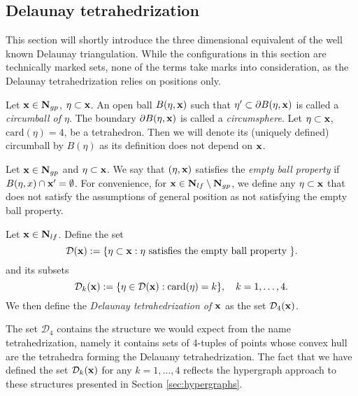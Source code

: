 \subsection{Delaunay tetrahedrization}
This section will shortly introduce the three dimensional equivalent of the well known Delaunay triangulation. While the configurations in this section are technically marked sets, none of the terms take marks into consideration, as the Delaunay tetrahedrization relies on positions only.

\begin{definition}
	Let ${\mathbf{x}} \in \mathbf N_{gp}$, $\eta \subset {\mathbf{x}}$. An open ball $B(\eta,{\mathbf{x}})$ such that $\eta' \subset \partial B(\eta,{\mathbf{x}})$ is called a \textit{circumball of $\eta$}. The boundary $\partial B(\eta,{\mathbf{x}})$ is called a \textit{circumsphere}.
	Let $\eta\subset{\mathbf{x}}$, $\mathrm{card}(\eta)=4$, be a tetrahedron. Then we will denote its (uniquely defined) circumball by $B(\eta)$ as its definition does not depend on ${\mathbf{x}}$. 
\end{definition}	

\begin{definition}
	Let ${\mathbf{x}} \in \mathbf N_{gp}$ and $\eta \subset {\mathbf{x}}$. We say that $(\eta,{\mathbf{x}})$ satisfies the \textit{empty ball property} if $B(\eta,x) \cap {\mathbf{x}}' = \emptyset$. 
	For convenience, for ${\mathbf{x}} \in \mathbf N_{lf}\setminus \mathbf N_{gp}$, we define any $\eta\subset {\mathbf{x}}$ that does not satisfy the assumptions of general position as not satisfying the empty ball property.
\end{definition}

\begin{definition}
	Let ${\mathbf{x}} \in \mathbf N_{lf}$. Define the set 
	$$\mathcal {D}({\mathbf{x}}) := \{\eta\subset {\mathbf{x}}: \eta \text{ satisfies the empty ball property }\}.$$
	and its subsets
	$$\mathcal {D}_k({\mathbf{x}}) := \{\eta \in \mathcal {D}({\mathbf{x}}): \mathrm{card}(\eta)=k \},\quad k = 1,\dots,4.$$
	We then define the \textit{Delaunay tetrahedrization of ${\mathbf{x}}$} as the set $\mathcal D_4({\mathbf{x}})$. 
\end{definition}

The set $\mathcal D_4$ contains the structure we would expect from the name tetrahedrization, namely it contains sets of 4-tuples of points whose convex hull are the tetrahedra  forming the Delauany tetrahedrization. The fact that we have defined the set $\mathcal D_k({\mathbf{x}})$ for any $k=1,\dots,4$ reflects the hypergraph approach to these structures presented in Section \ref{sec:hypergraphs}.

